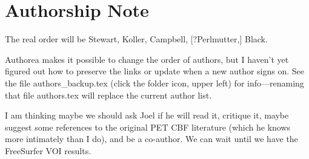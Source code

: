 \section*{Authorship Note}
The real order will be Stewart, Koller, Campbell, [?Perlmutter,] Black.

Authorea makes it possible to change the order of authors, but I haven't yet figured out how to preserve the links or update when a new author signs on. See the file authors\_backup.tex (click the folder icon, upper left) for info---renaming that file authors.tex will replace the current author list.

I am thinking maybe we should ask Joel if he will read it, critique it, maybe suggest some references to the original PET CBF literature (which he knows more intimately than I do), and be a co-author. We can wait until we have the FreeSurfer VOI results.
